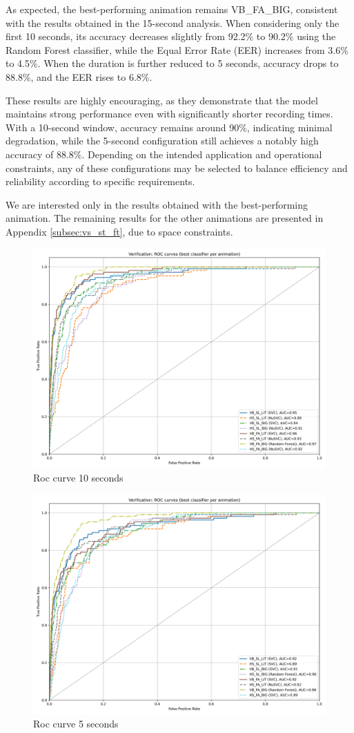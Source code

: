 \documentclass{article}
\begin{document}
As expected, the best-performing animation remains VB\_FA\_BIG, consistent with the results obtained in the 15-second analysis.
When considering only the first 10 seconds, its accuracy decreases slightly from 92.2\% to 90.2\% using the Random Forest classifier, while the Equal Error Rate (EER) increases from 3.6\% to 4.5\%.
When the duration is further reduced to 5 seconds, accuracy drops to 88.8\%, and the EER rises to 6.8\%.

These results are highly encouraging, as they demonstrate that the model maintains strong performance even with significantly shorter recording times.
With a 10-second window, accuracy remains around 90\%, indicating minimal degradation, while the 5-second configuration still achieves a notably high accuracy of 88.8\%.
Depending on the intended application and operational constraints, any of these configurations may be selected to balance efficiency and reliability according to specific requirements.

We are interested only in the results obtained with the best-performing animation.
The remaining results for the other animations are presented in Appendix \ref{subsec:vs_st_ft}, due to space constraints.

\begin{figure}[ht]
    \centering
    \includegraphics[width = 0.6
    \textwidth]{Images/Results/Verification_single_five_ten/st/ten/best_animation_roc_curves_ten_st.png}
    \caption{Roc curve 10 seconds}
    \label{fig:roc_t}
\end{figure}

\begin{figure}[ht]
    \centering
    \includegraphics[width = 0.6
    \textwidth]{Images/Results/Verification_single_five_ten/st/five/best_animation_roc_curves_five_st.png}
    \caption{Roc curve 5 seconds}
    \label{fig:roc_f}
\end{figure}
\end{document}
